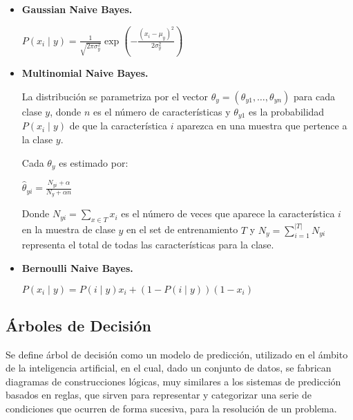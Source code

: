 \begin{itemize}
	
	\item \textbf{Gaussian Naive Bayes.}
	
	\begin{center}
		$P(x_i \mid y) = \frac{1}{\sqrt{2\pi\sigma^2_y}} \exp\left(-\frac{(x_i - \mu_y)^2}{2\sigma^2_y}\right)$
	\end{center}
	
	\item \textbf{Multinomial Naive Bayes.}
	
	La distribución se parametriza por el vector $\theta_y = (\theta_{y1},\ldots,\theta_{yn})$ para cada clase $y$, donde $n$ es el número de características y $\theta_{y1}$ es la probabilidad $P(x_i \mid y)$ de que la característica $i$ aparezca en una muestra que pertence a la clase $y$.
	
	Cada $\theta_y$ es estimado por:
	
	\begin{center}
		
		$\hat{\theta}_{yi} = \frac{ N_{yi} + \alpha}{N_y + \alpha n}$		
	\end{center}
	
	Donde $N_{yi} = \sum_{x \in T} x_i$ es el número  de veces que aparece la característica $i$ en la muestra de clase $y$ en el set de entrenamiento $T$ y $N_{y} = \sum_{i=1}^{|T|} N_{yi}$ representa el total de todas las características para la clase.
	
	\item \textbf{Bernoulli Naive Bayes.}
	
	\begin{center}
		$P(x_i \mid y) = P(i \mid y) x_i + (1 - P(i \mid y)) (1 - x_i)$
	\end{center}
	
\end{itemize}

\subsection{Árboles de Decisión}

Se define árbol de  decisión como un modelo de predicción, utilizado en el ámbito de la inteligencia artificial, en el cual,  dado un conjunto de datos, se fabrican diagramas de construcciones lógicas, muy similares a los sistemas de predicción basados en reglas, que sirven para representar y categorizar una serie de condiciones que ocurren de forma sucesiva, para la resolución de un problema.  

